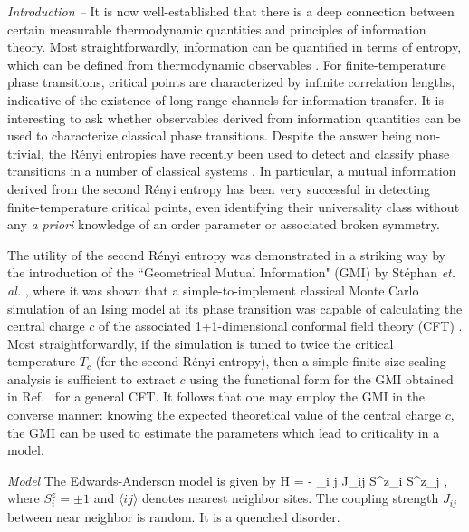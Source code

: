 \documentclass[a4paper,aps,prl,reprint,superscriptaddress,twocolumn,floatfix]{revtex4-1}
\begin{document}
{\em Introduction --}
It is now well-established that there is a deep connection between certain measurable thermodynamic quantities
and principles of information theory.  
Most straightforwardly, information can be quantified in terms of entropy, which can be defined from thermodynamic observables \cite{shannon,cardy}. 
For finite-temperature phase transitions, critical points are characterized by infinite
correlation lengths, indicative of the existence of long-range
channels for information transfer.  
It is interesting to ask whether observables derived from information quantities can be used to characterize
classical phase transitions.
Despite the answer being non-trivial, the R\'enyi entropies have recently been used to 
detect and classify phase transitions in a number of
classical systems \cite{stephen2013,stephan2014,troyer,vidal,Alba1,Alba2,stephen2016,Johannes}.
In particular, a mutual information derived from the second R\'enyi entropy \cite{melko2010,Singh,WL} has been very successful in 
detecting finite-temperature critical points, even identifying their universality class
without any {\it a priori} knowledge of an order parameter or associated broken symmetry.


The utility of the second R\'enyi entropy was demonstrated in a striking way by the introduction of the 
``Geometrical Mutual Information" (GMI) by St\'ephan {\it et. al.} \cite{stephan2014}, where it was shown that a 
simple-to-implement classical Monte Carlo simulation of an Ising model at its phase transition
was capable of calculating the central charge $c$ of the associated 1+1-dimensional conformal field theory (CFT)
\cite{belavin,friedan,wilczek,kitaev,cardy}.
Most straightforwardly, if the simulation is tuned to twice the critical temperature $T_c$ (for the second R\'enyi entropy), then a 
simple finite-size scaling analysis is sufficient to extract $c$ using the functional form for the GMI obtained in
Ref.~\cite{stephan2014} for a general CFT.  
It follows that one may employ the GMI in the converse manner: knowing the expected theoretical value of the central charge $c$,
the GMI can be used to estimate the parameters which lead to criticality in a model.  


{\em Model}
The Edwards-Anderson model is given by
\beq 
H = - \sum_{\langle i j \rangle} J_{ij} S^z_i S^z_j  ,
\label{EA-model}
\eeq
where $S^z_i = \pm 1 $ and $ \langle i j \rangle $ denotes nearest neighbor sites. The coupling strength $J_{ij}$  between near
neighbor is random. It is a quenched disorder.
\end{document}
